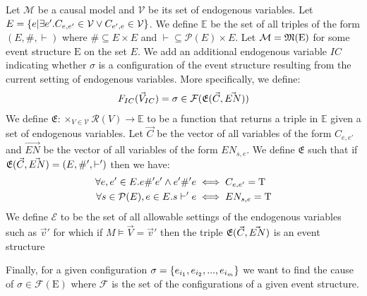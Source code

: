 Let $\mathcal{M}$ be a causal model and $\mathcal{V}$ be its set of
endogenous variables.
Let $E = \{e|\exists e'. C_{e,e'} \in \mathcal{V} \vee C_{e',e} \in \mathcal{V} \}$.
We define $\mathbb{E}$ be the set of all
triples of the form $(E,\#,\vdash)$ where $\# \subseteq E \times E$
and $\vdash \subseteq \mathcal{P}(E) \times E$.
Let $\mathcal{M} = \mathfrak{M}(\mathrm{E})$ for some event structure
$\mathrm{E}$ on the set $E$.
We add an additional endogenous variable $IC$ indicating 
whether $\sigma$ is a configuration of the event structure resulting from
the current setting of endogenous variables.
More specifically, we define:
\begin{align*}
    F_{IC}(\vec V_{IC}) = \sigma \in \mathcal{F}(\mathfrak{E}(\vec C, \vec {EN}))
\end{align*}
We define $\mathfrak{E}: \times_{V \in \mathcal{V}} \mathcal{R}(V) \rightarrow \mathbb{E}$
to be a function that returns a triple in $\mathbb{E}$ given a set of
endogenous variables.
Let $\vec C$ be the vector of all variables of the form $C_{e,e'}$ 
and $\vec{EN}$ be the vector of all variables of the form $EN_{s,e}$.
We define $\mathfrak{E}$ such that if
$\mathfrak{E}(\vec C,\vec {EN}) = (E, \#',\vdash')$ then we have:
\begin{align*}
    \forall e,e' \in E. e \#' e' \wedge e' \#' e
     & \iff C_{e,e'} = \mathrm{T} \\
    \forall s \in \mathcal{P}(E), e \in E.  s \vdash' e
     & \iff EN_{s,e} = \mathrm{T}
\end{align*}
We define $\mathcal{E}$ to be the set of all allowable
settings of the endogenous variables such as $\vec v'$
for which if $M \vDash \vec V = \vec v'$ then the triple $\mathfrak{E}(\vec C,\vec {EN})$ is an event structure

Finally, for a given configuration $\sigma = \{e_{i_1},e_{i_2},...,e_{i_m}\}$
we want to find the cause of
$\sigma \in \mathcal{F}(\mathrm{E})$ where $\mathcal{F}$
is the set of the configurations of a given event structure.

